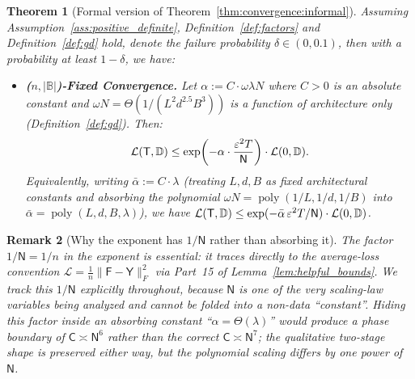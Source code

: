 \documentclass[11pt]{article}
\theoremstyle{plain}
\newtheorem{theorem}{Theorem}[section]
\newtheorem{remark}[theorem]{Remark}
\DeclareMathOperator{\poly}{poly}
\begin{document}
\begin{theorem}[Formal version of Theorem~\ref{thm:convergence:informal}]\label{thm:convergence}
    Assuming Assumption~\ref{ass:positive_definite}, Definition~\ref{def:factors} and Definition~\ref{def:gd} hold, denote the failure probability $\delta \in (0, 0.1)$, then with a probability at least $ 1 - \delta$, we have:
    \begin{itemize}
        \item {\bf ($n, |\mathbb{B}|$)-Fixed Convergence.} Let $\alpha := C\cdot \omega\lambda N$ where $C>0$ is an absolute constant and $\omega N = \Theta(1/(L^2 d^{2.5}B^3))$ is a function of architecture only (Definition~\ref{def:gd}). Then:
        \begin{align*}
            {\cal L}({\sf T}, \mathbb{D}) \leq \exp\!\left(- \alpha \cdot \frac{\varepsilon^2  T}{\mathsf{N}}\right) \cdot {\cal L}(0, \mathbb{D}).
        \end{align*}
        Equivalently, writing $\bar\alpha := C\cdot\lambda$ (treating $L,d,B$ as fixed architectural constants and absorbing the polynomial $\omega N = \poly(1/L,1/d,1/B)$ into $\bar\alpha = \poly(L,d,B,\lambda)$), we have ${\cal L}({\sf T}, \mathbb{D}) \leq \exp(-\bar\alpha\,\varepsilon^2 T/\mathsf{N})\cdot {\cal L}(0,\mathbb{D})$.
    \end{itemize}
\end{theorem}

\begin{remark}[Why the exponent has $1/\mathsf{N}$ rather than absorbing it]\label{rem:n_in_rate}
The factor $1/\mathsf{N} = 1/n$ in the exponent is essential: it traces directly to the average-loss convention $\mathcal{L} = \frac{1}{n}\|\mathsf{F}-\mathsf{Y}\|_F^2$ via Part~15 of Lemma~\ref{lem:helpful_bounds}. We track this $1/\mathsf{N}$ explicitly throughout, because $\mathsf{N}$ is one of the very scaling-law variables being analyzed and cannot be folded into a non-data ``constant''. Hiding this factor inside an absorbing constant ``$\alpha=\Theta(\lambda)$'' would produce a phase boundary of $\mathsf{C}\asymp\mathsf{N}^6$ rather than the correct $\mathsf{C}\asymp\mathsf{N}^7$; the qualitative two-stage shape is preserved either way, but the polynomial scaling differs by one power of $\mathsf{N}$.
\end{remark}
\end{document}
